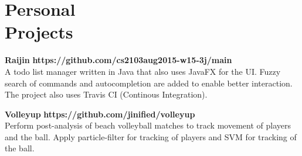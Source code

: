 \documentclass[margin,line]{resume}
\begin{document}
\begin{resume}
\begin{itemize}
    \end{itemize}

    \section{\mysidestyle Personal\\Projects}

    \textbf{Raijin} \hfill \textbf{https://github.com/cs2103aug2015-w15-3j/main} \\ 
    A todo list manager written in Java that also uses JavaFX for the UI. Fuzzy
    search of commands and autocompletion are added to enable better
    interaction. The project also uses Travis CI (Continous Integration).

    \textbf{Volleyup} \hfill \textbf{https://github.com/jinified/volleyup} \\
    Perform post-analysis of beach volleyball matches to track movement of
    players and the ball. Apply particle-filter for tracking of players and SVM
    for tracking of the ball.

\end{resume}
\end{document}
